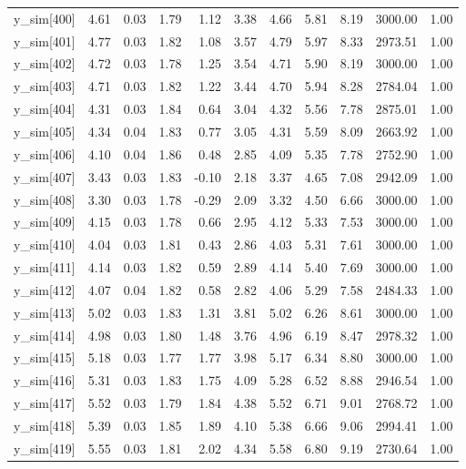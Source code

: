 \begin{table}[ht]
\begin{tabular}{rrrrrrrrrrr}
  y\_sim[400] & 4.61 & 0.03 & 1.79 & 1.12 & 3.38 & 4.66 & 5.81 & 8.19 & 3000.00 & 1.00 \\ 
  y\_sim[401] & 4.77 & 0.03 & 1.82 & 1.08 & 3.57 & 4.79 & 5.97 & 8.33 & 2973.51 & 1.00 \\ 
  y\_sim[402] & 4.72 & 0.03 & 1.78 & 1.25 & 3.54 & 4.71 & 5.90 & 8.19 & 3000.00 & 1.00 \\ 
  y\_sim[403] & 4.71 & 0.03 & 1.82 & 1.22 & 3.44 & 4.70 & 5.94 & 8.28 & 2784.04 & 1.00 \\ 
  y\_sim[404] & 4.31 & 0.03 & 1.84 & 0.64 & 3.04 & 4.32 & 5.56 & 7.78 & 2875.01 & 1.00 \\ 
  y\_sim[405] & 4.34 & 0.04 & 1.83 & 0.77 & 3.05 & 4.31 & 5.59 & 8.09 & 2663.92 & 1.00 \\ 
  y\_sim[406] & 4.10 & 0.04 & 1.86 & 0.48 & 2.85 & 4.09 & 5.35 & 7.78 & 2752.90 & 1.00 \\ 
  y\_sim[407] & 3.43 & 0.03 & 1.83 & -0.10 & 2.18 & 3.37 & 4.65 & 7.08 & 2942.09 & 1.00 \\ 
  y\_sim[408] & 3.30 & 0.03 & 1.78 & -0.29 & 2.09 & 3.32 & 4.50 & 6.66 & 3000.00 & 1.00 \\ 
  y\_sim[409] & 4.15 & 0.03 & 1.78 & 0.66 & 2.95 & 4.12 & 5.33 & 7.53 & 3000.00 & 1.00 \\ 
  y\_sim[410] & 4.04 & 0.03 & 1.81 & 0.43 & 2.86 & 4.03 & 5.31 & 7.61 & 3000.00 & 1.00 \\ 
  y\_sim[411] & 4.14 & 0.03 & 1.82 & 0.59 & 2.89 & 4.14 & 5.40 & 7.69 & 3000.00 & 1.00 \\ 
  y\_sim[412] & 4.07 & 0.04 & 1.82 & 0.58 & 2.82 & 4.06 & 5.29 & 7.58 & 2484.33 & 1.00 \\ 
  y\_sim[413] & 5.02 & 0.03 & 1.83 & 1.31 & 3.81 & 5.02 & 6.26 & 8.61 & 3000.00 & 1.00 \\ 
  y\_sim[414] & 4.98 & 0.03 & 1.80 & 1.48 & 3.76 & 4.96 & 6.19 & 8.47 & 2978.32 & 1.00 \\ 
  y\_sim[415] & 5.18 & 0.03 & 1.77 & 1.77 & 3.98 & 5.17 & 6.34 & 8.80 & 3000.00 & 1.00 \\ 
  y\_sim[416] & 5.31 & 0.03 & 1.83 & 1.75 & 4.09 & 5.28 & 6.52 & 8.88 & 2946.54 & 1.00 \\ 
  y\_sim[417] & 5.52 & 0.03 & 1.79 & 1.84 & 4.38 & 5.52 & 6.71 & 9.01 & 2768.72 & 1.00 \\ 
  y\_sim[418] & 5.39 & 0.03 & 1.85 & 1.89 & 4.10 & 5.38 & 6.66 & 9.06 & 2994.41 & 1.00 \\ 
  y\_sim[419] & 5.55 & 0.03 & 1.81 & 2.02 & 4.34 & 5.58 & 6.80 & 9.19 & 2730.64 & 1.00 \\ 

\end{tabular}
\end{table}
